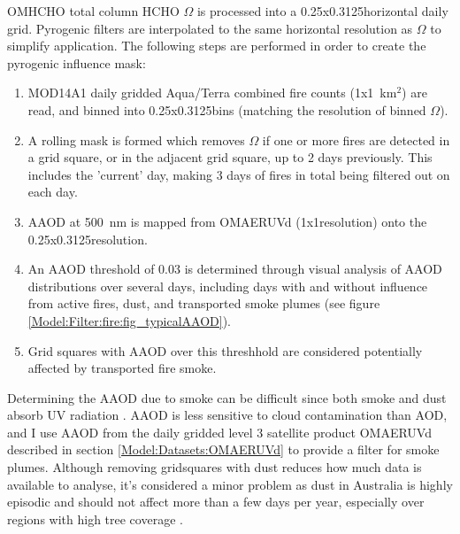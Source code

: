     OMHCHO total column HCHO $\Omega$ is processed into a 0.25x0.3125\degr horizontal daily grid.
    Pyrogenic filters are interpolated to the same horizontal resolution as $\Omega$ to simplify application. 
    The following steps are performed in order to create the pyrogenic influence mask:
    \begin{enumerate}
      \item MOD14A1 daily gridded Aqua/Terra combined fire counts (1x1~km$^2$) are read, and binned into 0.25x0.3125\degr bins (matching the resolution of binned $\Omega$).
      \item A rolling mask is formed which removes $\Omega$ if one or more fires are detected in a grid square, or in the adjacent grid square, up to 2 days previously.
      This includes the 'current' day, making 3 days of fires in total being filtered out on each day.
      \item AAOD at 500~nm is mapped from OMAERUVd (1x1\degr resolution) onto the 0.25x0.3125\degr resolution.
      \item An AAOD threshold of 0.03 is determined through visual analysis of AAOD distributions over several days, including days with and without influence from active fires, dust, and transported smoke plumes (see figure \ref{Model:Filter:fire:fig_typicalAAOD}).
      \item Grid squares with AAOD over this threshhold are considered potentially affected by transported fire smoke.
    \end{enumerate}
  
    Determining the AAOD due to smoke can be difficult since both smoke and dust absorb UV radiation \parencite{Ahn2008,Marais2012}.
    AAOD is less sensitive to cloud contamination than AOD, and I use AAOD from the daily gridded level 3 satellite product OMAERUVd \parencite{Ahn2008} described in section \ref{Model:Datasets:OMAERUVd} to provide a filter for smoke plumes.
    Although removing gridsquares with dust reduces how much data is available to analyse, it's considered a minor problem as dust in Australia is highly episodic and should not affect more than a few days per year, especially over regions with high tree coverage \parencite{Shao2007}.
    
